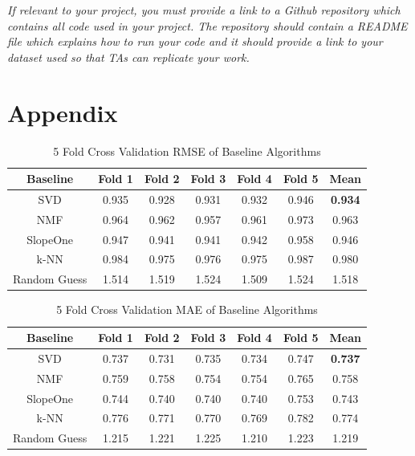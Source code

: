 \documentclass{article}
\begin{document}
\textit{If relevant to your project, you must provide a link to a Github repository which contains all code used in your project. The repository should contain a README file which explains how to run your code and it should provide a link to your dataset used so that TAs can replicate your work.}

\newpage

\section{Appendix}

\begin{table}[H]
    \centering
        \begin{tabular}{|c c c c c c c|} 
         \hline
         Baseline & Fold 1 & Fold 2 & Fold 3 & Fold 4 & Fold 5 & Mean \\ [0.5ex] 
         \hline\hline
         SVD & 0.935 & 0.928 & 0.931 & 0.932 & 0.946 & \bfseries 0.934 \\ 
         \hline
         NMF & 0.964 & 0.962 & 0.957 & 0.961 & 0.973 & 0.963 \\
         \hline
         SlopeOne & 0.947 & 0.941 & 0.941 & 0.942 & 0.958 & 0.946 \\
         \hline
         k-NN & 0.984 & 0.975 & 0.976 & 0.975 & 0.987 & 0.980 \\
         \hline
         Random Guess & 1.514 & 1.519 & 1.524 & 1.509 & 1.524 & 1.518 \\ [1ex] 
         \hline
        \end{tabular}
    \caption{5 Fold Cross Validation RMSE of Baseline Algorithms}
    \label{tab:rmse_results}
\end{table}

\begin{table}[H]
    \centering
        \begin{tabular}{|c c c c c c c|} 
         \hline
         Baseline & Fold 1 & Fold 2 & Fold 3 & Fold 4 & Fold 5 & Mean \\ [0.5ex] 
         \hline\hline
         SVD & 0.737 & 0.731 & 0.735 & 0.734 & 0.747 & \bfseries 0.737 \\ 
         \hline
         NMF & 0.759 & 0.758 & 0.754 & 0.754 & 0.765 & 0.758 \\
         \hline
         SlopeOne & 0.744 & 0.740 & 0.740 & 0.740 & 0.753 & 0.743 \\
         \hline
         k-NN & 0.776 & 0.771 & 0.770 & 0.769 & 0.782 & 0.774 \\
         \hline
         Random Guess & 1.215 & 1.221 & 1.225 & 1.210 & 1.223 & 1.219 \\ [1ex] 
         \hline
        \end{tabular}
    \caption{5 Fold Cross Validation MAE of Baseline Algorithms}
    \label{tab:mae_results}
\end{table}
\end{document}

